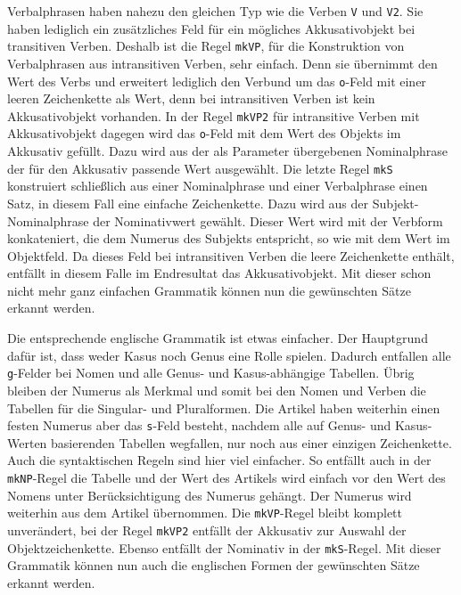 \documentclass[fontsize=12pt,abstract=on,titlepage,bibliography=totoc,ngerman,listof=totoc]{scrreprt}
\begin{document}
Verbalphrasen haben nahezu den gleichen Typ wie die Verben \texttt{V} und \texttt{V2}. Sie haben lediglich ein zusätzliches Feld für ein mögliches Akkusativobjekt bei transitiven Verben. Deshalb ist die Regel \texttt{mkVP}, für die Konstruktion von Verbalphrasen aus intransitiven Verben, sehr einfach. Denn sie übernimmt den Wert des Verbs und erweitert lediglich den Verbund um das \texttt{o}-Feld mit einer leeren Zeichenkette als Wert, denn bei intransitiven Verben ist kein Akkusativobjekt vorhanden. In der Regel \texttt{mkVP2} für intransitive Verben mit Akkusativobjekt dagegen wird das \texttt{o}-Feld mit dem Wert des Objekts im Akkusativ gefüllt. Dazu wird aus der als Parameter übergebenen Nominalphrase der für den Akkusativ passende Wert ausgewählt. Die letzte Regel \texttt{mkS} konstruiert schließlich aus einer Nominalphrase und einer Verbalphrase einen Satz, in diesem Fall eine einfache Zeichenkette. Dazu wird aus der Subjekt-Nominalphrase der Nominativwert gewählt. Dieser Wert wird mit der Verbform konkateniert, die dem Numerus des Subjekts entspricht, so wie mit dem Wert im Objektfeld. Da dieses Feld bei intransitiven Verben die leere Zeichenkette enthält, entfällt in diesem Falle im Endresultat das Akkusativobjekt. Mit dieser schon nicht mehr ganz einfachen Grammatik können nun die gewünschten Sätze erkannt werden. \par

Die entsprechende englische Grammatik ist etwas einfacher. Der Hauptgrund dafür ist, dass weder Kasus noch Genus eine Rolle spielen. Dadurch entfallen alle \texttt{g}-Felder bei Nomen und alle Genus- und Kasus-abhängige Tabellen. Übrig bleiben der Numerus als Merkmal und somit bei den Nomen und Verben die Tabellen für die Singular- und Pluralformen. Die Artikel haben weiterhin einen festen Numerus aber das \texttt{s}-Feld besteht, nachdem alle auf Genus- und Kasus-Werten basierenden Tabellen wegfallen, nur noch aus einer einzigen Zeichenkette. Auch die syntaktischen Regeln sind hier viel einfacher. So entfällt auch in der \texttt{mkNP}-Regel die Tabelle und der Wert des Artikels wird einfach vor den Wert des Nomens unter Berücksichtigung des Numerus gehängt. Der Numerus wird weiterhin aus dem Artikel übernommen. Die \texttt{mkVP}-Regel bleibt komplett unverändert, bei der Regel \texttt{mkVP2} entfällt der Akkusativ zur Auswahl der Objektzeichenkette. Ebenso entfällt der Nominativ in der \texttt{mkS}-Regel. Mit dieser Grammatik können nun auch die englischen Formen der gewünschten Sätze erkannt werden. \par
\end{document}

